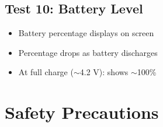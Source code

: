 \documentclass[a4paper,11pt]{article}
\renewcommand*{\,}{ }%
\begin{document}
\subsection{Test 10: Battery Level}

\begin{itemize}
    \item[$\square$] Battery percentage displays on screen
    \item[$\square$] Percentage drops as battery discharges
    \item[$\square$] At full charge ($\sim$4.2\,V): shows $\sim$100\%
\end{itemize}

\section{Safety Precautions}
\label{sec:safety}
\end{document}
